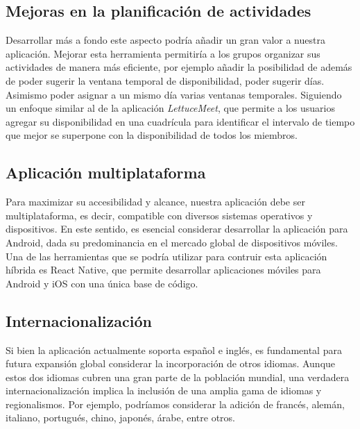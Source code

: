         \subsection{Mejoras en la planificación de actividades}
            Desarrollar más a fondo este aspecto podría añadir un gran valor a nuestra aplicación. Mejorar esta herramienta permitiría a los grupos organizar sus actividades de manera más eficiente, por ejemplo añadir la posibilidad de además de poder sugerir la ventana temporal de disponibilidad, poder sugerir días. Asimismo poder asignar a un mismo día varias ventanas temporales. Siguiendo un enfoque similar al de la aplicación \textit{LettuceMeet}\cite{REF7}, que permite a los usuarios agregar su disponibilidad en una cuadrícula para identificar el intervalo de tiempo que mejor se superpone con la disponibilidad de todos los miembros.

        \subsection{Aplicación multiplataforma}
            Para maximizar su accesibilidad y alcance, nuestra aplicación debe ser multiplataforma, es decir, compatible con diversos sistemas operativos y dispositivos. En este sentido, es esencial considerar desarrollar la aplicación para Android,
             dada su predominancia en el mercado global de dispositivos móviles. Una de las herramientas que se podría utilizar
             para contruir esta aplicación híbrida es React Native\cite{REF17}, que permite desarrollar aplicaciones móviles para Android y iOS con una única base de código.

        \subsection{Internacionalización}
            Si bien la aplicación actualmente soporta español e inglés, es fundamental para futura expansión global considerar la incorporación de otros idiomas. Aunque estos dos idiomas cubren una gran parte de la población mundial, una verdadera internacionalización implica la inclusión de una amplia gama de idiomas y regionalismos. Por ejemplo, podríamos considerar la adición de francés, alemán, italiano, portugués, chino, japonés, árabe, entre otros.

